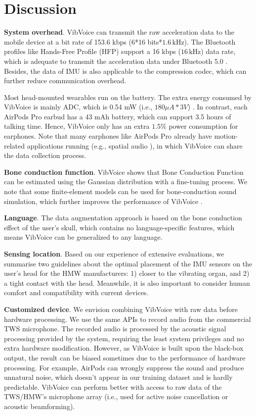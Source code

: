 \section{Discussion}
\noindent\textbf{System overhead}.
VibVoice can transmit the raw acceleration data to the mobile device at a bit rate of 153.6 kbps (6*16 bits*$1.6\,\text{kHz}$). The Bluetooth profiles like Hands-Free Profile (HFP) support a 16 kbps ($16\,\text{kHz}$) data rate, which is adequate to transmit the acceleration data under Bluetooth 5.0 \citep{Bluetoot0:online}. Besides, the data of IMU is also applicable to the compression codec, which can further reduce communication overhead.   

Most head-mounted wearables run on the battery. The extra energy consumed by VibVoice is mainly ADC, which is 0.54 mW (i.e., $180 \mu A * 3 V$) \citep{Inertial63:online}. In contrast, each AirPods Pro earbud has a 43 mAh battery, which can support 3.5 hours of talking time. Hence, VibVoice only has an extra $1.5\%$ power consumption for earphones. Note that many earphones like AirPods Pro already have motion-related applications running (e.g., spatial audio \citep{spatial-audio}), in which VibVoice can share the data collection process.

\noindent\textbf{Bone conduction function}.
VibVoice shows that Bone Conduction Function can be estimated using the Gaussian distribution with a fine-tuning process. We note that some finite-element models can be used for bone-conduction sound simulation, which further improves the performance of VibVoice \citep{chang2016development}.

\noindent\textbf{Language}.
The data augmentation approach is based on the bone conduction effect of the user's skull, which contains no language-specific features, which means VibVoice can be generalized to any language.

\noindent\textbf{Sensing location}.
Based on our experience of extensive evaluations, we summarise two guidelines about the optimal placement of the IMU sensors on the user's head for the HMW manufacturers: 1) closer to the vibrating organ, and 2) a tight contact with the head. Meanwhile, it is also important to consider human comfort and compatibility with current devices.

\noindent\textbf{Customized device}.
We envision combining VibVoice with raw data before hardware processing. We use the same APIs to record audio from the commercial TWS microphone. The recorded audio is processed by the acoustic signal processing provided by the system, requiring the least system privileges and no extra hardware modification. However, as VibVoice is built upon the black-box output, the result can be biased sometimes due to the performance of hardware processing. For example, AirPods can wrongly suppress the sound and produce unnatural noise, which doesn't appear in our training dataset and is hardly predictable. VibVoice can perform better with access to raw data of the TWS/HMW's microphone array (i.e., used for active noise cancellation or acoustic beamforming).
